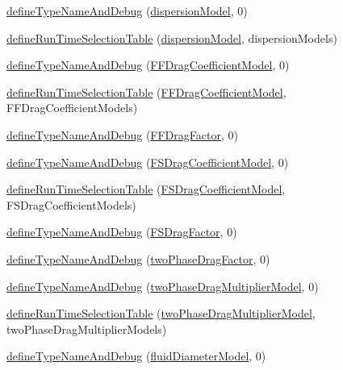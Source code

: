\begin{DoxyCompactItemize}
\item 
\hyperlink{namespaceFoam_a672ec3ac9d220de336d15c99f5ee83cb}{define\+Type\+Name\+And\+Debug} (\hyperlink{classFoam_1_1dispersionModel}{dispersion\+Model}, 0)
\item 
\hyperlink{namespaceFoam_a8ff9b36a5731cc722983d2843de53a15}{define\+Run\+Time\+Selection\+Table} (\hyperlink{classFoam_1_1dispersionModel}{dispersion\+Model}, dispersion\+Models)
\item 
\hyperlink{namespaceFoam_ab5d3afe316516d7f82e11fe89507b9a0}{define\+Type\+Name\+And\+Debug} (\hyperlink{classFoam_1_1FFDragCoefficientModel}{F\+F\+Drag\+Coefficient\+Model}, 0)
\item 
\hyperlink{namespaceFoam_a40bcf5620ebd155f0759b939bdefd602}{define\+Run\+Time\+Selection\+Table} (\hyperlink{classFoam_1_1FFDragCoefficientModel}{F\+F\+Drag\+Coefficient\+Model}, F\+F\+Drag\+Coefficient\+Models)
\item 
\hyperlink{namespaceFoam_a95e1598c75ccdc26ba7adb8ef6bc2f44}{define\+Type\+Name\+And\+Debug} (\hyperlink{classFoam_1_1FFDragFactor}{F\+F\+Drag\+Factor}, 0)
\item 
\hyperlink{namespaceFoam_ad432e5807396a04b74d50c31ddef7504}{define\+Type\+Name\+And\+Debug} (\hyperlink{classFoam_1_1FSDragCoefficientModel}{F\+S\+Drag\+Coefficient\+Model}, 0)
\item 
\hyperlink{namespaceFoam_a380c54a84fb0817c14a9235555b1b690}{define\+Run\+Time\+Selection\+Table} (\hyperlink{classFoam_1_1FSDragCoefficientModel}{F\+S\+Drag\+Coefficient\+Model}, F\+S\+Drag\+Coefficient\+Models)
\item 
\hyperlink{namespaceFoam_a3a28118e077af0bc34c15f650add86b9}{define\+Type\+Name\+And\+Debug} (\hyperlink{classFoam_1_1FSDragFactor}{F\+S\+Drag\+Factor}, 0)
\item 
\hyperlink{namespaceFoam_afd86aa52864bbcd6cc71e1f15c4f3be3}{define\+Type\+Name\+And\+Debug} (\hyperlink{classFoam_1_1twoPhaseDragFactor}{two\+Phase\+Drag\+Factor}, 0)
\item 
\hyperlink{namespaceFoam_acdfc0832896cb04db1cbd7d9d1c92523}{define\+Type\+Name\+And\+Debug} (\hyperlink{classFoam_1_1twoPhaseDragMultiplierModel}{two\+Phase\+Drag\+Multiplier\+Model}, 0)
\item 
\hyperlink{namespaceFoam_a70a45ab3aa7a41db4a6d95d5d62d48f2}{define\+Run\+Time\+Selection\+Table} (\hyperlink{classFoam_1_1twoPhaseDragMultiplierModel}{two\+Phase\+Drag\+Multiplier\+Model}, two\+Phase\+Drag\+Multiplier\+Models)
\item 
\hyperlink{namespaceFoam_aa3fee0ceaf905699f7d3a622b6051772}{define\+Type\+Name\+And\+Debug} (\hyperlink{classFoam_1_1fluidDiameterModel}{fluid\+Diameter\+Model}, 0)

\end{DoxyCompactItemize}
